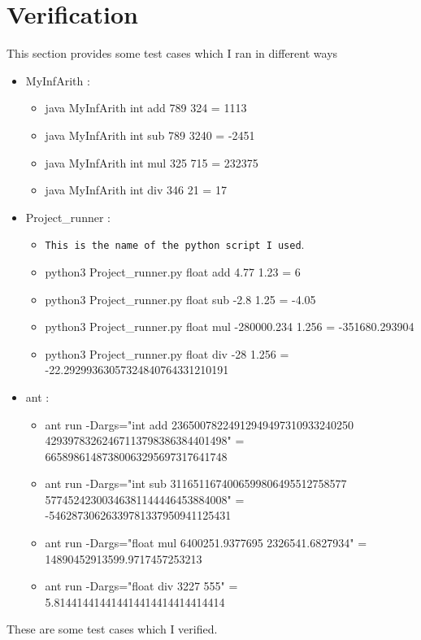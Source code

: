 \documentclass{article}
\begin{document}
\section{Verification}
This section provides some test cases which I ran in different ways
\begin{itemize}
    \item {MyInfArith :} 
\begin{itemize}
    \item java MyInfArith int add 789 324 = 1113

    \item java MyInfArith int sub 789 3240 = -2451

    \item java MyInfArith int mul 325 715 = 232375
    
    \item java MyInfArith int div 346 21 = 17 \\
    
\end{itemize}
    \item{Project\_runner :}

\begin{itemize}
\item\texttt{This is the name of the python script I used}. 
    \item python3 Project\_runner.py float add 4.77 1.23 = 6
    \item python3 Project\_runner.py float sub -2.8 1.25 = -4.05
    \item python3 Project\_runner.py float mul -280000.234 1.256 = -351680.293904
    \item python3 Project\_runner.py float div -28 1.256 = -22.29299363057324840764331210191 \\
\end{itemize}
    \item {ant :}
\begin{itemize}
    \item ant run -Dargs="int add 23650078224912949497310933240250 42939783262467113798386384401498" = 66589861487380063295697317641748
    \item ant run -Dargs="int sub 3116511674006599806495512758577 57745242300346381144446453884008" = -54628730626339781337950941125431
    \item ant run -Dargs="float mul  6400251.9377695 2326541.6827934" = 14890452913599.9717457253213
    \item ant run -Dargs="float div 3227 555" = 5.814414414414414414414414414414
\end{itemize}

\end{itemize}
These are some test cases which I verified.
\end{document}
